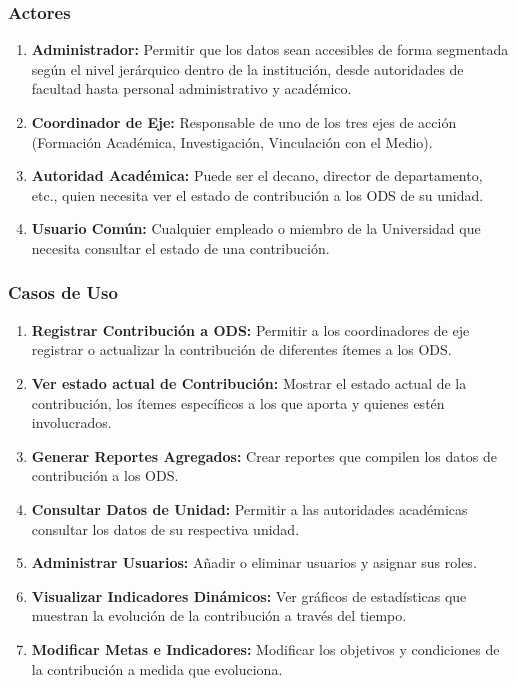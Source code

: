 \documentclass[12pt]{article}
\begin{document}
\subsubsection*{Actores}

\begin{enumerate}
  \item{\textbf{Administrador:} Permitir que los datos sean accesibles de forma segmentada según el nivel jerárquico dentro de la institución, desde autoridades de facultad hasta personal administrativo y académico.}
  \item{\textbf{Coordinador de Eje:} Responsable de uno de los tres ejes de acción (Formación Académica, Investigación, Vinculación con el Medio).}
  \item{\textbf{Autoridad Académica:} Puede ser el decano, director de departamento, etc., quien necesita ver el estado de contribución a los ODS de su unidad.}
  \item{\textbf{Usuario Común:} Cualquier empleado o miembro de la Universidad que necesita consultar el estado de una contribución.}   
\end{enumerate}
\subsubsection*{Casos de Uso}
\begin{enumerate}
  \item{\textbf{Registrar Contribución a ODS:} Permitir a los coordinadores de eje registrar o actualizar la contribución de diferentes ítemes a los ODS.}
  \item{\textbf{Ver estado actual de Contribución:} Mostrar el estado actual de la contribución, los ítemes específicos a los que aporta y quienes estén involucrados.}
  \item{\textbf{Generar Reportes Agregados:} Crear reportes que compilen los datos de contribución a los ODS.}
  \item{\textbf{Consultar Datos de Unidad:} Permitir a las autoridades académicas consultar los datos de su respectiva unidad.}
  \item{\textbf{Administrar Usuarios:} Añadir o eliminar usuarios y asignar sus roles.}
  \item{\textbf{Visualizar Indicadores Dinámicos:}  Ver gráficos  de estadísticas que muestran la evolución de la contribución a través del tiempo.}
  \item{\textbf{Modificar Metas e Indicadores:} Modificar los objetivos y condiciones de la contribución a medida que evoluciona.}
\end{enumerate}
\end{document}
